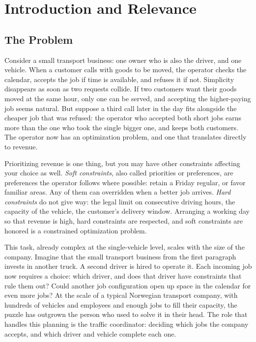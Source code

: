 \chapter{Introduction and Relevance}
\label{chap:introduction}

\section{The Problem}
\label{sec:problem}

Consider a small transport business: one owner who is also the driver, and one vehicle. When a customer calls with goods to be moved, the operator checks the calendar, accepts the job if time is available, and refuses it if not. Simplicity disappears as soon as two requests collide. If two customers want their goods moved at the same hour, only one can be served, and accepting the higher-paying job seems natural. But suppose a third call later in the day fits alongside the cheaper job that was refused: the operator who accepted both short jobs earns more than the one who took the single bigger one, and keeps both customers. The operator now has an optimization problem, and one that translates directly to revenue.

Prioritizing revenue is one thing, but you may have other constraints affecting your choice as well. \emph{Soft constraints}, also called priorities or preferences, are preferences the operator follows where possible: retain a Friday regular, or favor familiar areas. Any of them can overridden when a better job arrives. \emph{Hard constraints} do not give way: the legal limit on consecutive driving hours, the capacity of the vehicle, the customer's delivery window. Arranging a working day so that revenue is high, hard constraints are respected, and soft constraints are honored is a constrained optimization problem.

This task, already complex at the single-vehicle level, scales with the size of the company. Imagine that the small transport business from the first paragraph invests in another truck. A second driver is hired to operate it. Each incoming job now requires a choice: which driver, and does that driver have constraints that rule them out? Could another job configuration open up space in the calendar for even more jobs? At the scale of a typical Norwegian transport company, with hundreds of vehicles and employees and enough jobs to fill their capacity, the puzzle has outgrown the person who used to solve it in their head. The role that handles this planning is the traffic coordinator: deciding which jobs the company accepts, and which driver and vehicle complete each one.

